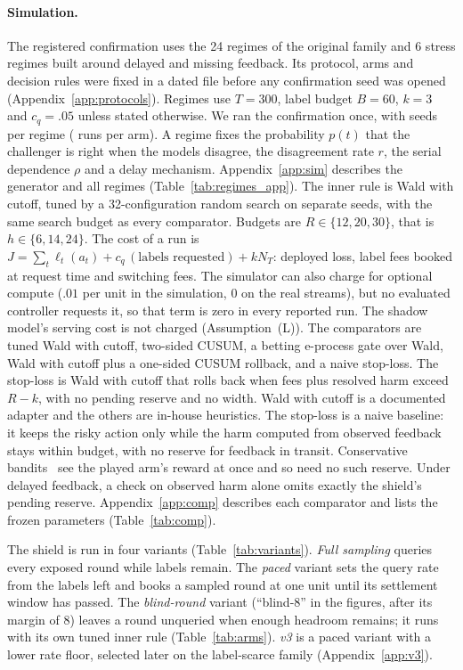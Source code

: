 \documentclass[10pt]{article}
\theoremstyle{plain}
\theoremstyle{definition}
\begin{document}
\paragraph{Simulation.}
The registered confirmation uses the 24 regimes of the original family and 6 stress regimes built around delayed and missing feedback. Its protocol, arms and decision rules were fixed in a dated file before any confirmation seed was opened (Appendix~\ref{app:protocols}). Regimes use $T=300$, label budget $B=60$, $k=3$ and $c_q=.05$ unless stated otherwise. We ran the confirmation once, with \NSeedsPerRegime{} seeds per regime (\NRunsPerArm{} runs per arm). A regime fixes the probability $p(t)$ that the challenger is right when the models disagree, the disagreement rate $r$, the serial dependence $\rho$ and a delay mechanism. Appendix~\ref{app:sim} describes the generator and all \NRegimes{} regimes (Table~\ref{tab:regimes_app}).
The inner rule is Wald with cutoff, tuned by a 32-configuration random search on separate seeds, with the same search budget as every comparator. Budgets are $R\in\{12,20,30\}$, that is $h\in\{6,14,24\}$. The cost of a run is $J=\sum_t\ell_t(a_t)+c_q\,(\text{labels requested})+k N_T$: deployed loss, label fees booked at request time and switching fees. The simulator can also charge for optional compute ($.01$ per unit in the simulation, $0$ on the real streams), but no evaluated controller requests it, so that term is zero in every reported run. The shadow model's serving cost is not charged (Assumption~(L)).
The comparators are tuned Wald with cutoff, two-sided CUSUM, a betting e-process gate over Wald, Wald with cutoff plus a one-sided CUSUM rollback, and a naive stop-loss. The stop-loss is Wald with cutoff that rolls back when fees plus resolved harm exceed $R-k$, with no pending reserve and no width. Wald with cutoff is a documented adapter and the others are in-house heuristics. The stop-loss is a naive baseline: it keeps the risky action only while the harm computed from observed feedback stays within budget, with no reserve for feedback in transit. Conservative bandits~\citep{wu2016conservative} see the played arm's reward at once and so need no such reserve. Under delayed feedback, a check on observed harm alone omits exactly the shield's pending reserve. Appendix~\ref{app:comp} describes each comparator and lists the frozen parameters (Table~\ref{tab:comp}).

The shield is run in four variants (Table~\ref{tab:variants}). \emph{Full sampling} queries every exposed round while labels remain. The \emph{paced} variant sets the query rate from the labels left and books a sampled round at one unit until its settlement window has passed. The \emph{blind-round} variant (``blind-8'' in the figures, after its margin of 8) leaves a round unqueried when enough headroom remains; it runs with its own tuned inner rule (Table~\ref{tab:arms}). \emph{v3} is a paced variant with a lower rate floor, selected later on the label-scarce family (Appendix~\ref{app:v3}).
\end{document}
